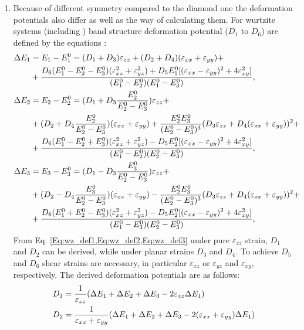 \begin{enumerate}
	\item Because of different symmetry compared to the diamond one the deformation potentials also differ as well as the way of calculating them. For wurtzite systems (including \SO) band structure deformation potential ($D_1$ to $D_6$) are defined by the equations \cite{birpikus}:
	\begin{align}
		\Delta E_1 &= E_1 - E_1^0 = (D_1 + D_3)\varepsilon_{zz} + (D_2 + D_4)(\varepsilon_{xx} + \varepsilon_{yy}) +\notag\\ &+\frac{D_6(E_1^0-E_2^0-E_3^0)(\varepsilon_{xz}^2+\varepsilon_{yz}^2)+D_5E_1^0[(\varepsilon_{xx}-\varepsilon_{yy})^2+4\varepsilon_{xy}^2]}{(E_1^0-E_2^0)(E_1^0-E_3^0)},\label{Eq:wz_def1}\\
		\Delta E_2 &= E_2 - E_2^0 = (D_1 + D_3\frac{E_2^0}{E_2^0-E_3^0})\varepsilon_{zz} + \notag\\
		&+(D_2 + D_4\frac{E_2^0}{E_2^0-E_3^0})(\varepsilon_{xx} + \varepsilon_{yy}) + \frac{E_2^0E_3^0}{(E_2^0-E_3^0)^3}(D_3\varepsilon_{zz}+D_4(\varepsilon_{xx}+\varepsilon_{yy}))^2 +\notag\\
		&+\frac{D_6(E_1^0-E_2^0+E_3^0)(\varepsilon_{xz}^2+\varepsilon_{yz}^2)-D_5E_2^0[(\varepsilon_{xx}-\varepsilon_{yy})^2+4\varepsilon_{xy}^2]}{(E_1^0-E_2^0)(E_2^0-E_3^0)},\label{Eq:wz_def2}\\
		\Delta E_3 &= E_3 - E_3^0 = (D_1 - D_3\frac{E_3^0}{E_2^0-E_3^0})\varepsilon_{zz} + \notag\\
		&+(D_2 - D_4\frac{E_3^0}{E_2^0-E_3^0})(\varepsilon_{xx} + \varepsilon_{yy}) - \frac{E_2^0E_3^0}{(E_2^0-E_3^0)^3}(D_3\varepsilon_{zz}+D_4(\varepsilon_{xx}+\varepsilon_{yy}))^2 +\notag\\
		&+\frac{D_6(E_1^0+E_2^0-E_3^0)(\varepsilon_{xz}^2+\varepsilon_{yz}^2)-D_5E_2^0[(\varepsilon_{xx}-\varepsilon_{yy})^2+4\varepsilon_{xy}^2]}{(E_1^0-E_3^0)(E_2^0-E_3^0)},\label{Eq:wz_def3}
	\end{align}
	From Eq. \cref{Eq:wz_def1,Eq:wz_def2,Eq:wz_def3} under pure $\varepsilon_{zz}$ strain, $D_1$ and $D_2$ can be derived, while under planar strains $D_3$ and $D_4$. To achieve $D_5$ and $D_6$ shear strains are necessary, in particular $\varepsilon_{xz}$ or $\varepsilon_{yz}$ and $\varepsilon_{xy}$, respectively.
	The derived deformation potentials are as follows:
	\begin{align}
		D_1 &= \frac{1}{\varepsilon_{zz}}(\Delta E_1+\Delta E_2+\Delta E_3-2\varepsilon_{zz}\Delta E_1)\notag\\
		D_2 &= \frac{1}{\varepsilon_{xx}+\varepsilon_{yy}}(\Delta E_1+\Delta E_2+\Delta E_3-2(\varepsilon_{xx}+\varepsilon_{yy})\Delta E_1)\notag\\

\end{align}
\end{enumerate}
